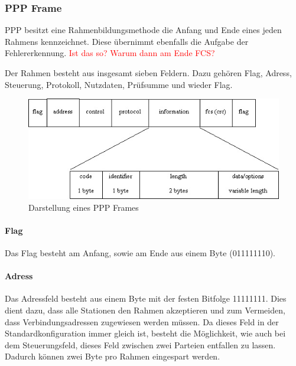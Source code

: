 \documentclass[12pt, a4paper, ngerman]{article}
\begin{document}
\subsubsection{PPP Frame}

PPP besitzt eine Rahmenbildungsmethode die Anfang und Ende eines jeden Rahmens kennzeichnet. Diese übernimmt ebenfalls die Aufgabe der Fehlererkennung. \textcolor{red}{Ist das so? Warum dann am Ende FCS?}

Der Rahmen besteht aus insgesamt sieben Feldern. Dazu gehören Flag, Adress, Steuerung,  Protokoll, Nutzdaten, Prüfsumme und wieder Flag.

\begin{figure}[H]
	\centering
	\includegraphics[width=1\textwidth]{Grafiken/ppp-frame.jpg}	
	\caption{Darstellung eines PPP Frames \cite{ppp-lcp-info.header}}
	\label{ppp_frame}
\end{figure}

\paragraph{Flag}

Das Flag besteht am Anfang, sowie am Ende  aus einem Byte (011111110). 


\paragraph{Adress}

Das Adressfeld besteht aus einem Byte mit der festen Bitfolge 11111111. Dies dient dazu, dass alle Stationen den Rahmen akzeptieren und zum Vermeiden, dass Verbindungsadressen zugewiesen werden müssen. Da dieses Feld in der Standardkonfiguration immer gleich ist, besteht die Möglichkeit, wie auch bei dem Steuerungsfeld, dieses Feld zwischen zwei Parteien entfallen zu lassen. Dadurch können zwei Byte pro Rahmen eingespart werden.
\end{document}
